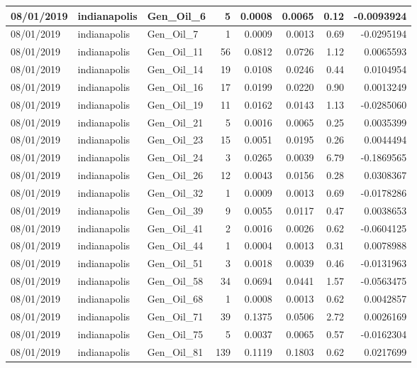 \documentclass[
  letterpaper,
  DIV=11,
  numbers=noendperiod]{scrartcl}
\begin{document}
\begin{tabular}{l|l|l|r|r|r|r|r}
\hline
08/01/2019 & indianapolis & Gen\_Oil\_6 & 5 & 0.0008 & 0.0065 & 0.12 & -0.0093924\\
\hline
08/01/2019 & indianapolis & Gen\_Oil\_7 & 1 & 0.0009 & 0.0013 & 0.69 & -0.0295194\\
\hline
08/01/2019 & indianapolis & Gen\_Oil\_11 & 56 & 0.0812 & 0.0726 & 1.12 & 0.0065593\\
\hline
08/01/2019 & indianapolis & Gen\_Oil\_14 & 19 & 0.0108 & 0.0246 & 0.44 & 0.0104954\\
\hline
08/01/2019 & indianapolis & Gen\_Oil\_16 & 17 & 0.0199 & 0.0220 & 0.90 & 0.0013249\\
\hline
08/01/2019 & indianapolis & Gen\_Oil\_19 & 11 & 0.0162 & 0.0143 & 1.13 & -0.0285060\\
\hline
08/01/2019 & indianapolis & Gen\_Oil\_21 & 5 & 0.0016 & 0.0065 & 0.25 & 0.0035399\\
\hline
08/01/2019 & indianapolis & Gen\_Oil\_23 & 15 & 0.0051 & 0.0195 & 0.26 & 0.0044494\\
\hline
08/01/2019 & indianapolis & Gen\_Oil\_24 & 3 & 0.0265 & 0.0039 & 6.79 & -0.1869565\\
\hline
08/01/2019 & indianapolis & Gen\_Oil\_26 & 12 & 0.0043 & 0.0156 & 0.28 & 0.0308367\\
\hline
08/01/2019 & indianapolis & Gen\_Oil\_32 & 1 & 0.0009 & 0.0013 & 0.69 & -0.0178286\\
\hline
08/01/2019 & indianapolis & Gen\_Oil\_39 & 9 & 0.0055 & 0.0117 & 0.47 & 0.0038653\\
\hline
08/01/2019 & indianapolis & Gen\_Oil\_41 & 2 & 0.0016 & 0.0026 & 0.62 & -0.0604125\\
\hline
08/01/2019 & indianapolis & Gen\_Oil\_44 & 1 & 0.0004 & 0.0013 & 0.31 & 0.0078988\\
\hline
08/01/2019 & indianapolis & Gen\_Oil\_51 & 3 & 0.0018 & 0.0039 & 0.46 & -0.0131963\\
\hline
08/01/2019 & indianapolis & Gen\_Oil\_58 & 34 & 0.0694 & 0.0441 & 1.57 & -0.0563475\\
\hline
08/01/2019 & indianapolis & Gen\_Oil\_68 & 1 & 0.0008 & 0.0013 & 0.62 & 0.0042857\\
\hline
08/01/2019 & indianapolis & Gen\_Oil\_71 & 39 & 0.1375 & 0.0506 & 2.72 & 0.0026169\\
\hline
08/01/2019 & indianapolis & Gen\_Oil\_75 & 5 & 0.0037 & 0.0065 & 0.57 & -0.0162304\\
\hline
08/01/2019 & indianapolis & Gen\_Oil\_81 & 139 & 0.1119 & 0.1803 & 0.62 & 0.0217699\\

\end{tabular}
\end{document}
